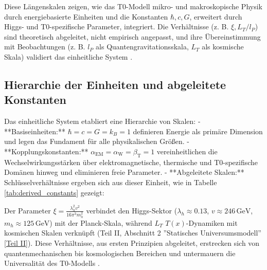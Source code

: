 \documentclass[12pt,a4paper]{article}
\newcommand{\Tfield}{T(x)}
\newcommand{\alphaEM}{\alpha_{\text{EM}}}
\newcommand{\alphaW}{\alpha_{\text{W}}}
\newcommand{\betaT}{\beta_{\text{T}}}
\begin{document}
	Diese Längenskalen zeigen, wie das T0-Modell mikro- und makroskopische Physik durch energiebasierte Einheiten und die Konstanten \(\hbar, c, G\), erweitert durch Higgs- und T0-spezifische Parameter, integriert. Die Verhältnisse (z. B. \(\xi, L_T/l_P\)) sind theoretisch abgeleitet, nicht empirisch angepasst, und ihre Übereinstimmung mit Beobachtungen (z. B. \(l_P\) als Quantengravitationsskala, \(L_T\) als kosmische Skala) validiert das einheitliche System \cite{pascher_alphabeta_2025}.
	
	\subsection{Hierarchie der Einheiten und abgeleitete Konstanten}
	\label{subsec:hierarchy}
	
	Das einheitliche System etabliert eine Hierarchie von Skalen:
	- **Basiseinheiten:** \(\hbar = c = G = k_B = 1\) definieren Energie als primäre Dimension und legen das Fundament für alle physikalischen Größen.
	- **Kopplungskonstanten:** \(\alphaEM = \alphaW = \betaT = 1\) vereinheitlichen die Wechselwirkungsstärken über elektromagnetische, thermische und T0-spezifische Domänen hinweg und eliminieren freie Parameter.
	- **Abgeleitete Skalen:** Schlüsselverhältnisse ergeben sich aus dieser Einheit, wie in Tabelle \ref{tab:derived_constants} gezeigt:
	\begin{table}[ht]
		\centering
		\caption{Abgeleitete Konstanten im T0-Modell, die Skalenhierarchien repräsentieren.}
		\label{tab:derived_constants}
	\end{table}
	
	Der Parameter \(\xi = \frac{\lambda_h^2 v^2}{16\pi^3 m_h^2}\) verbindet den Higgs-Sektor (\(\lambda_h \approx 0.13\), \(v \approx 246 \, \text{GeV}\), \(m_h \approx 125 \, \text{GeV}\)) mit der Planck-Skala, während \(L_T\) \(\Tfield\)-Dynamiken mit kosmischen Skalen verknüpft (Teil II, Abschnitt 2 ''Statisches Universumsmodell'' \href{https://github.com/jpascher/T0-Time-Mass-Duality/tree/main/2/pdf/Deutsch/Bridging Quantum Mechanics and Relativity through Time-Mass Duality Part II Theoretical Foundations.pdf}{[Teil II]}). Diese Verhältnisse, aus ersten Prinzipien abgeleitet, erstrecken sich von quantenmechanischen bis kosmologischen Bereichen und untermauern die Universalität des T0-Modells \cite{pascher_alphabeta_2025}.
	
\end{document}
